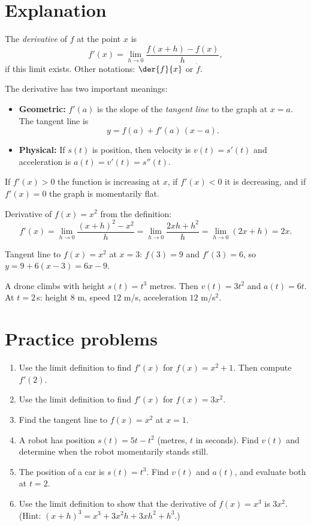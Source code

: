 \label{ch:derivative}

\section*{Explanation}
\begin{definition}
The \emph{derivative} of $f$ at the point $x$ is
\[
f'(x)=\lim_{h\to 0}\frac{f(x+h)-f(x)}{h},
\]
if this limit exists. Other notations: $\der{f}{x}$ or $\dot f$.
\end{definition}

The derivative has two important meanings:
\begin{itemize}
  \item \textbf{Geometric:} $f'(a)$ is the slope of the \emph{tangent line} to the graph at $x=a$. The tangent line is
  \[
  y = f(a) + f'(a)\,(x-a).
  \]
  \item \textbf{Physical:} If $s(t)$ is position, then velocity is $v(t)=s'(t)$ and acceleration is $a(t)=v'(t)=s''(t)$.
\end{itemize}
If $f'(x)>0$ the function is increasing at $x$, if $f'(x)<0$ it is decreasing, and if $f'(x)=0$ the graph is momentarily flat.

\begin{example}
Derivative of $f(x)=x^2$ from the definition:
\[
f'(x)=\lim_{h\to0}\frac{(x+h)^2-x^2}{h}=\lim_{h\to0}\frac{2xh+h^2}{h}=\lim_{h\to0}(2x+h)=2x.
\]
\end{example}

\begin{example}
Tangent line to $f(x)=x^2$ at $x=3$: $f(3)=9$ and $f'(3)=6$, so $y=9+6(x-3)=6x-9$.
\end{example}

\begin{example}
A drone climbs with height $s(t)=t^3$ metres. Then $v(t)=3t^2$ and $a(t)=6t$. At $t=2$\,s: height $8$ m, speed $12$ m/s, acceleration $12$ m/s$^2$.
\end{example}

\section*{Practice problems}
\begin{enumerate}[label=\textbf{\thechapter.\arabic*}]
  \item Use the limit definition to find $f'(x)$ for $f(x)=x^2+1$. Then compute $f'(2)$.
  \item Use the limit definition to find $f'(x)$ for $f(x)=3x^2$.
  \item Find the tangent line to $f(x)=x^2$ at $x=1$.
  \item A robot has position $s(t)=5t-t^2$ (metres, $t$ in seconds). Find $v(t)$ and determine when the robot momentarily stands still.
  \item The position of a car is $s(t)=t^3$. Find $v(t)$ and $a(t)$, and evaluate both at $t=2$.
  \item[\textbf{\thechapter.6}$\star$] Use the limit definition to show that the derivative of $f(x)=x^3$ is $3x^2$. (Hint: $(x+h)^3=x^3+3x^2h+3xh^2+h^3$.)
\end{enumerate}

